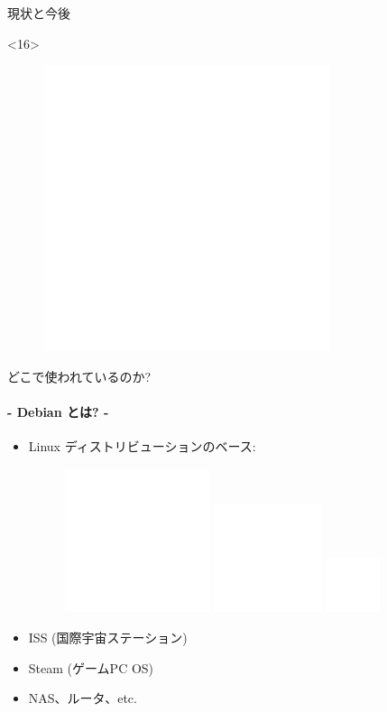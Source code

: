 \documentclass[cjk,dvipdfmx,14pt,compress,fragile]{beamer}
\begin{document}
\begin{frame}[c,fragile]{現状と今後}
\begin{onlyenv}
  \end{onlyenv}
  \begin{onlyenv}<16>
    \begin{figure}
      \centering
      \includegraphics[width=0.75\textwidth]{image201701/blank.png}
    \end{figure}
  \end{onlyenv}
\end{frame}

\begin{frame}[c,fragile]{どこで使われているのか?}
  \framesubtitle{- Debian とは? -}
  \pause
  \begin{itemize}[<+->]
  \item %
    Linux ディストリビューションの\alert{ベース}:
    \begin{figure}
      \centering
      \includegraphics<2->[width=0.4\textwidth]{image201701/blank.png}
      \includegraphics<2->[width=0.3\textwidth]{image201701/blank.png}
      \includegraphics<2->[width=0.15\textwidth]{image201701/blank.png}
    \end{figure}
  \item %
    ISS (国際宇宙ステーション)
  \item Steam (ゲームPC OS)
  \item NAS、ルータ、etc.
  \end{itemize}
\end{frame}
\end{document}
